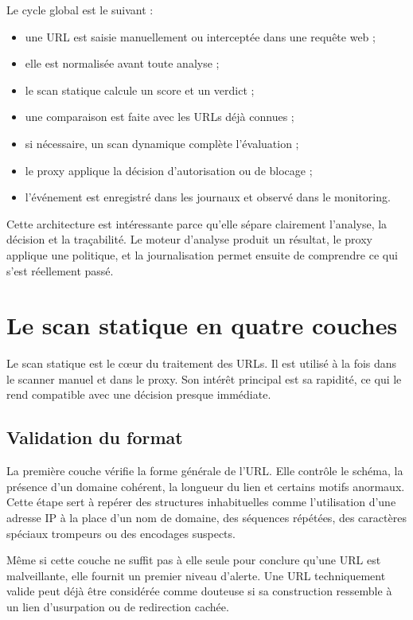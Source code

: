 ﻿\documentclass[12pt,a4paper]{report}
\begin{document}
Le cycle global est le suivant :

\begin{itemize}[leftmargin=1.2cm]
    \item une URL est saisie manuellement ou interceptée dans une requête web ;
    \item elle est normalisée avant toute analyse ;
    \item le scan statique calcule un score et un verdict ;
    \item une comparaison est faite avec les URLs déjà connues ;
    \item si nécessaire, un scan dynamique complète l'évaluation ;
    \item le proxy applique la décision d'autorisation ou de blocage ;
    \item l'événement est enregistré dans les journaux et observé dans le monitoring.
\end{itemize}

Cette architecture est intéressante parce qu'elle sépare clairement l'analyse, la décision et la traçabilité. Le moteur d'analyse produit un résultat, le proxy applique une politique, et la journalisation permet ensuite de comprendre ce qui s'est réellement passé.

\chapter{Le scan statique en quatre couches}

Le scan statique est le cœur du traitement des URLs. Il est utilisé à la fois dans le scanner manuel et dans le proxy. Son intérêt principal est sa rapidité, ce qui le rend compatible avec une décision presque immédiate.

\section{Validation du format}

La première couche vérifie la forme générale de l'URL. Elle contrôle le schéma, la présence d'un domaine cohérent, la longueur du lien et certains motifs anormaux. Cette étape sert à repérer des structures inhabituelles comme l'utilisation d'une adresse IP à la place d'un nom de domaine, des séquences répétées, des caractères spéciaux trompeurs ou des encodages suspects.

Même si cette couche ne suffit pas à elle seule pour conclure qu'une URL est malveillante, elle fournit un premier niveau d'alerte. Une URL techniquement valide peut déjà être considérée comme douteuse si sa construction ressemble à un lien d'usurpation ou de redirection cachée.
\end{document}
